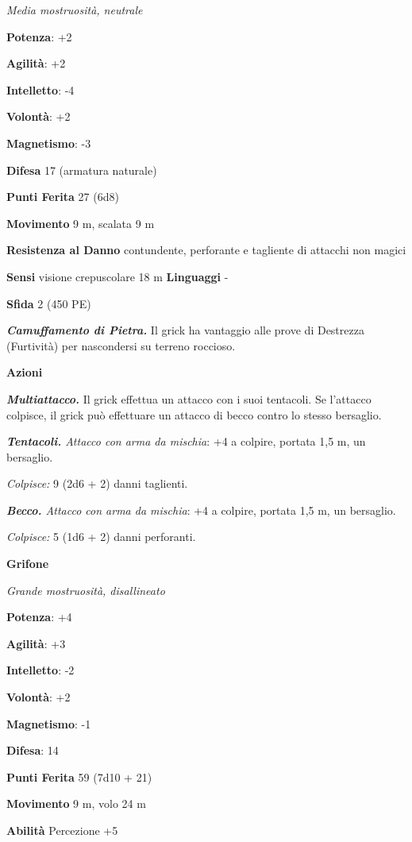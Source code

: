 \begin{multicols}{2}
\emph{Media mostruosità, neutrale}

\textbf{Potenza}: +2

\textbf{Agilità}: +2

\textbf{Intelletto}: -4

\textbf{Volontà}: +2

\textbf{Magnetismo}: -3

\textbf{Difesa} 17 (armatura naturale)

\textbf{Punti Ferita} 27 (6d8)

\textbf{Movimento} 9 m, scalata 9 m

\textbf{Resistenza al Danno} contundente, perforante e tagliente di
attacchi non magici

\textbf{Sensi} visione crepuscolare 18 m
\textbf{Linguaggi} -

\textbf{Sfida} 2 (450 PE)

\emph{\textbf{Camuffamento di Pietra.}} Il grick ha vantaggio alle prove
di Destrezza (Furtività) per nascondersi su terreno roccioso.

\textbf{Azioni}

\emph{\textbf{Multiattacco.}} Il grick effettua un attacco con i suoi
tentacoli. Se l'attacco colpisce, il grick può effettuare un attacco di
becco contro lo stesso bersaglio.

\emph{\textbf{Tentacoli.} Attacco con arma da mischia}: +4 a colpire,
portata 1,5 m, un bersaglio.

\emph{Colpisce:} 9 (2d6 + 2) danni taglienti.

\emph{\textbf{Becco.} Attacco con arma da mischia}: +4 a colpire,
portata 1,5 m, un bersaglio.

\emph{Colpisce:} 5 (1d6 + 2) danni perforanti.



\textbf{Grifone}

\emph{Grande mostruosità, disallineato}

\textbf{Potenza}: +4

\textbf{Agilità}: +3

\textbf{Intelletto}: -2

\textbf{Volontà}: +2

\textbf{Magnetismo}: -1

\textbf{Difesa}: 14

\textbf{Punti Ferita} 59 (7d10 + 21)

\textbf{Movimento} 9 m, volo 24 m

\textbf{Abilità} Percezione +5


\end{multicols}

